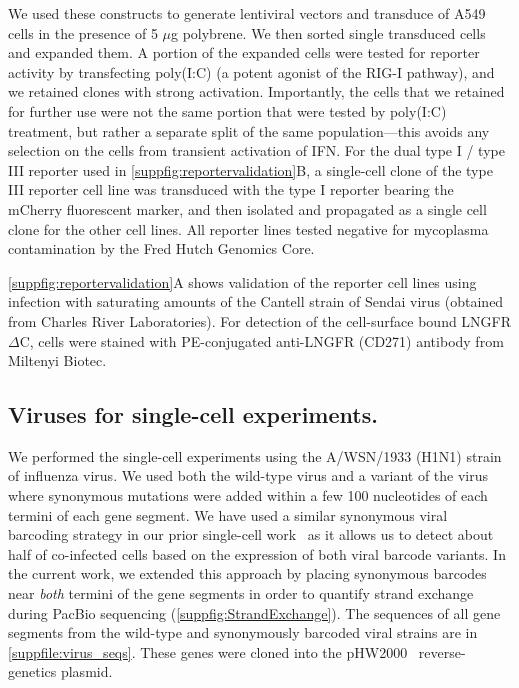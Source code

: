 \documentclass[]{asm-article}
\newcommand{\SUPPFILE}[1]{\autoref{suppfile:#1}}
\newcommand{\SUPPFIG}[1]{\autoref{suppfig:#1}}
\begin{document}
We used these constructs to generate lentiviral vectors and transduce of A549 cells in the presence of 5 $\mu$g polybrene.
We then sorted single transduced cells and expanded them.
A portion of the expanded cells were tested for reporter activity by transfecting poly(I:C) (a potent agonist of the RIG-I pathway), and we retained clones with strong activation.
Importantly, the cells that we retained for further use were not the same portion that were tested by poly(I:C) treatment, but rather a separate split of the same population---this avoids any selection on the cells from transient activation of IFN.
For the dual type I / type III reporter used in \SUPPFIG{reportervalidation}B, a single-cell clone of the type III reporter cell line was transduced with the type I reporter bearing the mCherry fluorescent marker, and then isolated and propagated as a single cell clone for the other cell lines.
All reporter lines tested negative for mycoplasma contamination by the Fred Hutch Genomics Core.

\SUPPFIG{reportervalidation}A shows validation of the reporter cell lines using infection with saturating amounts of the Cantell strain of Sendai virus (obtained from Charles River Laboratories).
For detection of the cell-surface bound LNGFR$\Delta$C, cells were stained with PE-conjugated anti-LNGFR (CD271) antibody from Miltenyi Biotec.

\subsection{Viruses for single-cell experiments.}
We performed the single-cell experiments using the A/WSN/1933 (H1N1) strain of influenza virus.
We used both the wild-type virus and a variant of the virus where synonymous mutations were added within a few 100 nucleotides of each termini of each gene segment.
We have used a similar synonymous viral barcoding strategy in our prior single-cell work~\cite{russell2018extreme} as it allows us to detect about half of co-infected cells based on the expression of both viral barcode variants.
In the current work, we extended this approach by placing synonymous barcodes near \emph{both} termini of the gene segments in order to quantify strand exchange during PacBio sequencing (\SUPPFIG{StrandExchange}).
The sequences of all gene segments from the wild-type and synonymously barcoded viral strains are in \SUPPFILE{virus_seqs}.
These genes were cloned into the pHW2000~\cite{hoffmann2000dna} reverse-genetics plasmid.
\end{document}
